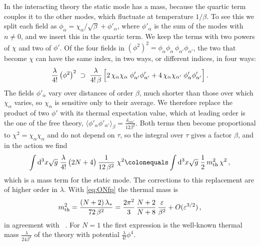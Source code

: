 \documentclass[a4paper,11pt]{article}
\newcommand{\dd}{\mathrm{d}}
\begin{document}
In the interacting theory the static mode has a mass, because the quartic term couples it to the other modes, which fluctuate at temperature $1/\beta$. To see this we split each field as $\phi_\alpha=\chi_\alpha/\sqrt\beta+\phi'_\alpha$, where $\phi'_\alpha$ is the sum of the modes with $n\neq0$, and we insert this in the quartic term. We keep the terms with two powers of $\chi$ and two of $\phi'$. Of the four fields in $(\phi^2)^2=\phi_\alpha\phi_\alpha\,\phi_{\alpha'}\phi_{\alpha'}$, the two that become $\chi$ can have the same index, in two ways, or different indices, in four ways:
\begin{equation}
	\frac{\lambda}{4!}\,\bigl(\phi^2\bigr)^2\;\supset\;\frac{\lambda}{4!\,\beta}\,
	\Bigl[2\,\chi_\alpha\chi_\alpha\;\phi'_{\alpha'}\phi'_{\alpha'}
	+4\,\chi_\alpha\chi_{\alpha'}\;\phi'_\alpha\phi'_{\alpha'}\Bigr]\, .
\end{equation}
The fields $\phi'_\alpha$ vary over distances of order $\beta$, much shorter than those over which $\chi_\alpha$ varies, so $\chi_\alpha$ is sensitive only to their average. We therefore replace the product of two $\phi'$ with its thermal expectation value, which at leading order is the one of the free theory, $\langle\phi'_\alpha\phi'_{\alpha'}\rangle_\beta=\tfrac{\delta_{\alpha\alpha'}}{12\beta^2}$. Both terms then become proportional to $\chi^2=\chi_\alpha\chi_\alpha$ and do not depend on $\tau$, so the integral over $\tau$ gives a factor $\beta$, and in the action we find
\begin{equation}
	\int\dd^3x\sqrt g\;\frac{\lambda}{4!}\,\bigl(2N+4\bigr)\,\frac{1}{12\,\beta^2}\;\chi^2
	\colonequals\int\dd^3x\sqrt g\;\frac12\,m_{\rm th}^2\,\chi^2\, ,
\end{equation}
which is a mass term for the static mode. The corrections to this replacement are of higher order in $\lambda$. With \eqref{eq:ONfp} the thermal mass is
\begin{equation}\label{eq:ONmth}
	m_{\rm th}^2=\frac{(N+2)\,\lambda_*}{72\,\beta^2}=\frac{2\pi^2}{3}\,\frac{N+2}{N+8}\,\frac{\varepsilon}{\beta^2}+O(\varepsilon^{3/2})\, ,
\end{equation}
in agreement with ~\cite{Chai:2020zgq,Barrat:2026ozj,BMP}. For $N=1$ the first expression is the well-known thermal mass $\tfrac{\lambda}{24\beta^2}$ of the theory with potential $\tfrac{\lambda}{4!}\phi^4$.
\end{document}

